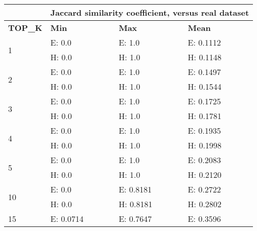 \begin{table}[]
\begin{tabular}{l|lll|}
\cline{2-4}
                                          & \multicolumn{3}{l|}{Jaccard similarity coefficient, versus real dataset}    \\ \hline
\multicolumn{1}{|l|}{\textbf{TOP\_K}}              & \multicolumn{1}{l|}{\textbf{Min}}       & \multicolumn{1}{l|}{\textbf{Max}}       & \textbf{Mean}      \\ \hline
\multicolumn{1}{|l|}{\multirow{2}{*}{1}}  & \multicolumn{1}{l|}{E: 0.0}    & \multicolumn{1}{l|}{E: 1.0}    & E: 0.1112 \\ \cline{2-4} 
\multicolumn{1}{|l|}{}                    & \multicolumn{1}{l|}{H: 0.0}    & \multicolumn{1}{l|}{H: 1.0}    & H: 0.1148 \\ \hline
\multicolumn{1}{|l|}{\multirow{2}{*}{2}}  & \multicolumn{1}{l|}{E: 0.0}    & \multicolumn{1}{l|}{E: 1.0}    & E: 0.1497 \\ \cline{2-4} 
\multicolumn{1}{|l|}{}                    & \multicolumn{1}{l|}{H: 0.0}    & \multicolumn{1}{l|}{H: 1.0}    & H: 0.1544 \\ \hline
\multicolumn{1}{|l|}{\multirow{2}{*}{3}}  & \multicolumn{1}{l|}{E: 0.0}    & \multicolumn{1}{l|}{E: 1.0}    & E: 0.1725 \\ \cline{2-4} 
\multicolumn{1}{|l|}{}                    & \multicolumn{1}{l|}{H: 0.0}    & \multicolumn{1}{l|}{H: 1.0}    & H: 0.1781 \\ \hline
\multicolumn{1}{|l|}{\multirow{2}{*}{4}}  & \multicolumn{1}{l|}{E: 0.0}    & \multicolumn{1}{l|}{E: 1.0}    & E: 0.1935 \\ \cline{2-4} 
\multicolumn{1}{|l|}{}                    & \multicolumn{1}{l|}{H: 0.0}    & \multicolumn{1}{l|}{H: 1.0}    & H: 0.1998 \\ \hline
\multicolumn{1}{|l|}{\multirow{2}{*}{5}}  & \multicolumn{1}{l|}{E: 0.0}    & \multicolumn{1}{l|}{E: 1.0}    & E: 0.2083 \\ \cline{2-4} 
\multicolumn{1}{|l|}{}                    & \multicolumn{1}{l|}{H: 0.0}    & \multicolumn{1}{l|}{H: 1.0}    & H: 0.2120 \\ \hline
\multicolumn{1}{|l|}{\multirow{2}{*}{10}} & \multicolumn{1}{l|}{E: 0.0}    & \multicolumn{1}{l|}{E: 0.8181} & E: 0.2722 \\ \cline{2-4} 
\multicolumn{1}{|l|}{}                    & \multicolumn{1}{l|}{H: 0.0}    & \multicolumn{1}{l|}{H: 0.8181} & H: 0.2802 \\ \hline
\multicolumn{1}{|l|}{\multirow{2}{*}{15}} & \multicolumn{1}{l|}{E: 0.0714}    & \multicolumn{1}{l|}{E: 0.7647} & E: 0.3596 \\ \cline{2-4} 

\end{tabular}
\end{table}

